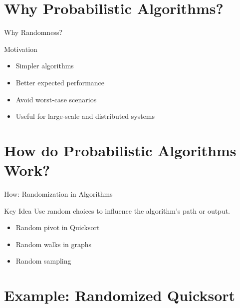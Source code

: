 \documentclass[aspectratio=169]{beamer}
\begin{document}
\section{Why Probabilistic Algorithms?}
\begin{frame}{Why Randomness?}
  \begin{block}{Motivation}
    \begin{itemize}
      \item Simpler algorithms

      \item Better expected performance

      \item Avoid worst-case scenarios

      \item Useful for large-scale and distributed systems
    \end{itemize}
  \end{block}
\end{frame}

\section{How do Probabilistic Algorithms Work?}
\begin{frame}{How: Randomization in Algorithms}
  \begin{block}{Key Idea}
    Use random choices to influence the algorithm's path or output.
  \end{block}

  \begin{itemize}
    \item Random pivot in Quicksort

    \item Random walks in graphs

    \item Random sampling
  \end{itemize}
\end{frame}

\section{Example: Randomized Quicksort}
\end{document}
